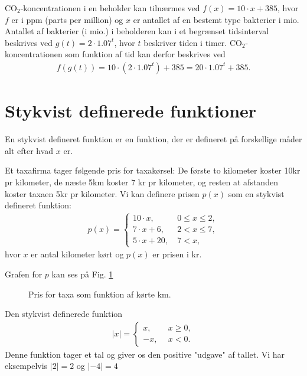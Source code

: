 \begin{exa}
CO$_2$-koncentrationen i en beholder kan tilnærmes ved $f(x) = 10\cdot x+385$, hvor $f$ er i ppm (parts per million) og $x$ er antallet af en bestemt type bakterier i mio. Antallet af bakterier (i mio.) i beholderen kan i et begrænset tidsinterval beskrives ved $g(t)= 2\cdot 1.07^t$, hvor $t$ beskriver tiden i timer. CO$_2$-koncentrationen som funktion af tid kan derfor beskrives ved
\begin{align*}
f(g(t)) = 10\cdot (2\cdot 1.07^t) + 385 = 20\cdot 1.07^t + 385.
\end{align*}
\section*{Stykvist definerede funktioner}
En stykvist defineret funktion er en funktion, der er defineret på forskellige måder alt efter hvad $x$ er.
\begin{exa}
Et taxafirma tager følgende pris for taxakørsel: De første to kilometer koster 10kr pr kilometer, de næste 5km koster 7 kr pr kilometer, og resten at afstanden koster taxaen 5kr pr kilometer. Vi kan definere prisen $p(x)$ som en stykvist defineret funktion:
\begin{align*}
p(x)=
\begin{cases}
10\cdot x, \ &0\leq x \leq 2,\\
7\cdot x + 6,\ &2 < x \leq 7,\\
5 \cdot x + 20,\ &7<x,
\end{cases}
\end{align*}
hvor $x$ er antal kilometer kørt og $p(x)$ er prisen i kr. 
\end{exa}
Grafen for $p$ kan ses på Fig. \ref{fig:stykvis}
\begin{figure}[H]
\centering
{}
\caption{Pris for taxa som funktion af kørte km.}
\label{fig:stykvis}
\end{figure}
\end{exa}
\begin{exa}
Den stykvist definerede funktion
\begin{align*}
|x| = \begin{cases}x, \ \ &x\geq 0,\\
-x, \ \ &x<0.
\end{cases}
\end{align*}
Denne funktion tager et tal og giver os den positive "udgave" af tallet. Vi har eksempelvis $|2| = 2$ og $|-4| = 4$
\end{exa}

